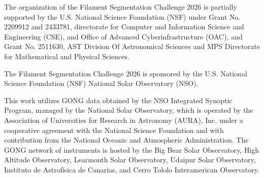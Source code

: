 \documentclass[sigconf]{acmart}
\begin{document}
    The organization of the Filament Segmentation Challenge 2026 is partially supported by the U.S. National Science Foundation (NSF) under Grant No. 2209912 and 2433781, directorate for Computer and Information Science and Engineering (CSE), and Office of Advanced Cyberinfrastructure (OAC), and Grant No. 2511630, AST Division Of Astronomical Sciences and MPS Directorate for Mathematical and Physical Sciences.

    The Filament Segmentation Challenge 2026 is sponsored by the U.S. National Science Foundation (NSF) National Solar Observatory (NSO). 

    This work utilizes GONG data obtained by the NSO Integrated Synoptic Program, managed by the National Solar Observatory, which is operated by the Association of Universities for Research in Astronomy (AURA), Inc. under a cooperative agreement with the National Science Foundation and with contribution from the National Oceanic and Atmospheric Administration. The GONG network of instruments is hosted by the Big Bear Solar Observatory, High Altitude Observatory, Learmonth Solar Observatory, Udaipur Solar Observatory, Instituto de Astrofísica de Canarias, and Cerro Tololo Interamerican Observatory.




\end{document}
